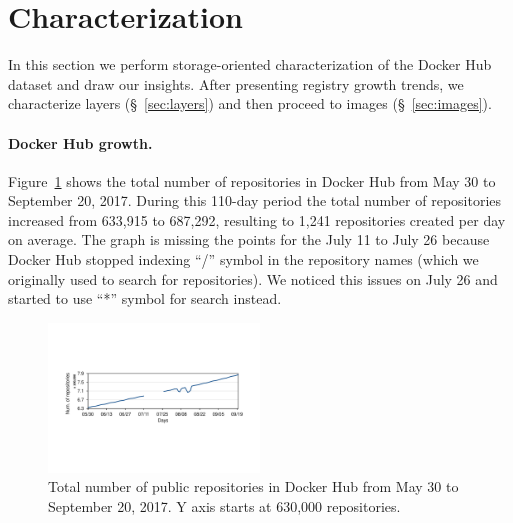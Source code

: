 \section{Characterization}
\label{sec:char}

In this section we perform storage-oriented characterization of the Docker Hub
dataset and draw our insights.
%
After presenting registry growth trends, we characterize layers
(\S~\ref{sec:layers}) and then proceed to images (\S~\ref{sec:images}).
%
\paragraph{Docker Hub growth.} Figure~\ref{fig_image_growth} shows the total
number of repositories in Docker Hub from May 30 to September 20, 2017.
%
%
During this 110-day period the total number of repositories increased from
633,915 to 687,292, resulting to 1,241 repositories created per day on average.
%
The graph is missing the points for the July 11 to July 26 because Docker Hub
stopped indexing ``/'' symbol in the repository names (which we originally used
to search for repositories).
%
We noticed this issues on July 26 and started to use ``*'' symbol for search
instead.


\begin{figure}
  \centering
  \includegraphics[width=0.5\textwidth]{graphs/image_growth.pdf}
  \caption{Total number of public repositories in Docker Hub
	   from May 30 to September 20, 2017. Y axis starts
	   at 630,000 repositories.
	  }
  \label{fig_image_growth}
\end{figure}



